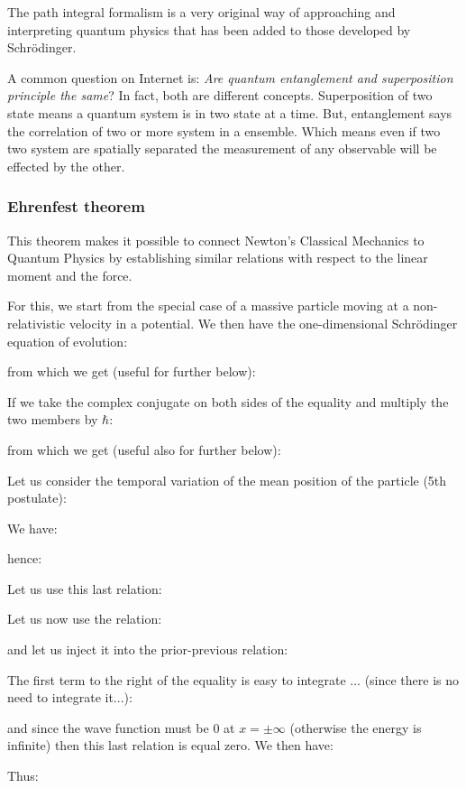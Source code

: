 	The path integral formalism is a very original way of approaching and interpreting quantum physics that has been added to those developed by Schrödinger.	 
	\begin{tcolorbox}[title=Remark,colframe=black,arc=10pt]
	A common question on Internet is: \textit{Are quantum entanglement and superposition principle the same}? In fact, both are different concepts. Superposition of two state means a quantum system is in two state at a time. But, entanglement says the correlation of two or more system in a ensemble. Which means even if two two system are spatially separated the measurement of any observable will be effected by the other.
	\end{tcolorbox}
	
	\pagebreak
	\subsubsection{Ehrenfest theorem}
	This theorem makes it possible to connect Newton's Classical Mechanics to Quantum Physics by establishing similar relations with respect to the linear moment and the force.

	For this, we start from the special case of a massive particle moving at a non-relativistic velocity in a potential. We then have the one-dimensional Schrödinger equation of evolution:
	
	from which we get (useful for further below):
	
	If we take the complex conjugate on both sides of the equality and multiply the two members by $\hbar$:
	
	from which we get (useful also for further below):
	
	Let us consider the temporal variation of the mean position of the particle (5th postulate):
	
	We have:
	
	hence:
	
	Let us use this last relation:
	
	Let us now use the relation:
	
	and let us inject it into the prior-previous relation:
	
	The first term to the right of the equality is easy to integrate ... (since there is no need to integrate it...):
	
	and since the wave function must be $0$ at $x=\pm \infty$  (otherwise the energy is infinite) then this last relation is equal zero. We then have:
	
	Thus:
	
